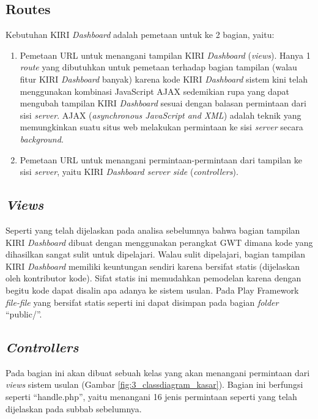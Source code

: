 \subsection{Routes}
\label{sec:routesusulan}
Kebutuhan KIRI \textit{Dashboard} adalah pemetaan untuk ke 2 bagian, yaitu:
\begin{enumerate}
	\item Pemetaan URL untuk menangani tampilan KIRI \textit{Dashboard} (\textit{views}). Hanya 1 \textit{route} yang dibutuhkan untuk pemetaan terhadap bagian tampilan (walau fitur KIRI \textit{Dashboard} banyak) karena kode KIRI \textit{Dashboard} sistem kini telah menggunakan kombinasi JavaScript  AJAX sedemikian rupa yang dapat mengubah tampilan KIRI \textit{Dashboard} sesuai dengan balasan permintaan dari sisi \textit{server}. AJAX (\textit{asynchronous JavaScript and XML}) adalah teknik yang memungkinkan suatu situs web melakukan permintaan ke sisi \textit{server} secara \textit{background}\cite{w3schools}.
	\item Pemetaan URL untuk menangani permintaan-permintaan dari tampilan ke sisi \textit{server}, yaitu KIRI \textit{Dashboard server side} (\textit{controllers}).
\end{enumerate}

\subsection{\textit{Views}}
\label{sec:viewusulan}
Seperti yang telah dijelaskan pada analisa sebelumnya bahwa bagian tampilan KIRI \textit{Dashboard} dibuat dengan menggunakan perangkat GWT dimana kode yang dihasilkan sangat sulit untuk dipelajari. Walau sulit dipelajari, bagian tampilan KIRI \textit{Dashboard} memiliki keuntungan sendiri karena bersifat statis (dijelaskan oleh kontributor kode). Sifat statis ini memudahkan pemodelan karena dengan begitu kode dapat disalin apa adanya ke sistem usulan. Pada Play Framework \textit{file-file} yang bersifat statis seperti ini dapat disimpan pada bagian \textit{folder} ``public/''.

\subsection{\textit{Controllers}}
\label{sec:controllerusulan}
Pada bagian ini akan dibuat sebuah kelas yang akan menangani permintaan dari \textit{views} sistem usulan (Gambar \ref{fig:3_classdiagram_kasar}). Bagian ini berfungsi seperti ``handle.php'', yaitu menangani 16 jenis permintaan seperti yang telah dijelaskan pada subbab sebelumnya.

